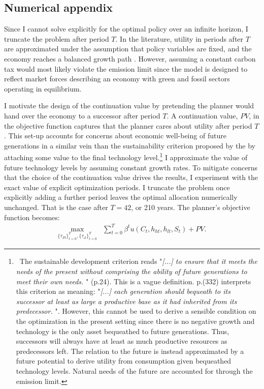 \subsection{Numerical appendix}\label{app:PV}

Since I cannot solve explicitly for the optimal policy over an infinite horizon, I truncate the problem after period $T$. 
In the literature, utility in periods after $T$ are approximated under the assumption that policy variables are fixed, and the economy reaches a balanced growth path \citep{Barrage2019OptimalPolicy, Jones1993OptimalGrowth}. However, assuming a constant carbon tax would most likely violate the emission limit since the model is designed to reflect market forces describing an economy with green and fossil sectors operating in equilibrium. 


I motivate the design of the continuation value by pretending the planner would hand over the economy to a successor after period $T$. A continuation value, $PV$, in the objective function captures that the planner cares about utility after period $T$. 
This set-up accounts for concerns about economic well-being of future generations in a similar vein than the sustainability criterion proposed by the \cite{UNSUS} by attaching some value to the final technology level.\footnote{\ The sustainable development criterion reads "\textit{[...] to ensure that it meets the needs of the present without comprising the ability of future generations to meet their own needs.
	}" (p.24). This is a vague definition.  \cite{Dasgupta2021} p.(332) interprets this criterion as meaning: 
	"\textit{[...] each generation should bequeath to its successor at least as large a productive base as it had inherited from its predecessor. }". 
	However, this cannot be used to derive a sensible condition on the optimization in the present setting since there is no negative growth and technology is the only asset bequeathed to future generations. Thus,
	successors will always have at least as much productive resources as predecessors left. The relation to the future is instead approximated by a future potential to derive utility from consumption given bequeathed technology levels. Natural needs of the future are accounted for through the emission limit. } I approximate the value of future technology levels by assuming constant growth rates.  
To mitigate concerns that the choice of the continuation value drives the results, I experiment with the exact value of explicit optimization periods. I truncate the problem once explicitly adding a further period leaves the optimal allocation numerically unchanged. That is the case after $T=42$, or 210 years. %
The planner's objective function becomes: 
\begin{align*}
\underset{\{\tau_{Ft}\}_{t=0}^{T},\{\tau_{\iota t}\}_{t=0}^{T}}{\max}&\sum_{t=0}^{T}\beta^t u(C_{t}, h_{ht}, h_{lt}, S_t)
+PV.
\end{align*}

